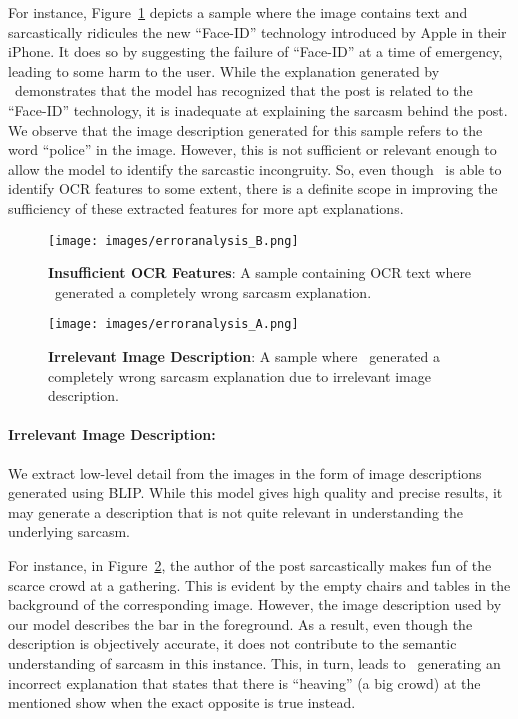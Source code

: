 For instance, Figure~\ref{fig:error-analysis-OCR} depicts a sample where the image contains text and sarcastically ridicules the new ``Face-ID'' technology introduced by Apple in their iPhone. It does so by suggesting the failure of ``Face-ID'' at a time of emergency, leading to some harm to the user. While the explanation generated by \model\ demonstrates that the model has recognized that the post is related to the ``Face-ID'' technology, it is inadequate at explaining the sarcasm behind the post. We observe that the image description generated for this sample refers to the word ``police'' in the image. However, this is not sufficient or relevant enough to allow the model to identify the sarcastic incongruity. 
So, even though \model\ is able to identify OCR features to some extent, there is a definite scope in improving the sufficiency of these extracted features for more apt explanations. 
\begin{figure}[!h]
\centering
  \texttt{[image: images/erroranalysis\_B.png]}
  \caption{\textbf{Insufficient OCR Features}: A sample containing OCR text where \model\ generated a completely wrong sarcasm explanation. %
}
\label{fig:error-analysis-OCR}
\end{figure}

\begin{figure}[!h]
\centering
  \texttt{[image: images/erroranalysis\_A.png]}
  \caption{\textbf{Irrelevant Image Description}: A sample where \model\ generated a completely wrong sarcasm explanation due to irrelevant image description. %
}
\label{fig:error-analysis-irrelevant-desc}
\end{figure}
\paragraph{Irrelevant Image Description:} We extract low-level detail from the images in the form of image descriptions generated using BLIP. While this model gives high quality and precise results, it may generate a description that is not quite relevant in understanding the underlying sarcasm. 

For instance, in Figure~\ref{fig:error-analysis-irrelevant-desc}, the author of the post sarcastically makes fun of the scarce crowd at a gathering. This is evident by the empty chairs and tables in the background of the corresponding image. However, the image description used by our model describes the bar in the foreground. As a result, even though the description is objectively accurate, it does not contribute to the semantic understanding of sarcasm in this instance. This, in turn, leads to \model\ generating an incorrect explanation that states that there is ``heaving'' (a big crowd) at the mentioned show when the exact opposite is true instead.  
